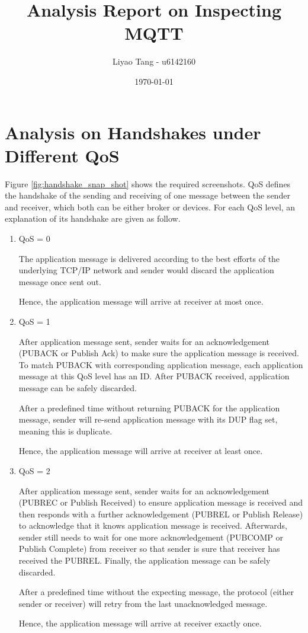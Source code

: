 \documentclass[12pt, letterpaper]{article}
\title{Analysis Report on Inspecting MQTT}
\author{Liyao Tang - u6142160}
\date{ \today}
\begin{document}
\begin{titlepage}
	\maketitle
\end{titlepage}

\section{Analysis on Handshakes under Different QoS}

Figure \ref{fig:handshake_snap_shot} shows the required screenshots. QoS defines the handshake of the sending and receiving of one message between the sender and receiver, which both can be either broker or devices. For each QoS level, an explanation of its handshake are given as follow.
\begin{enumerate}

	\item QoS = 0
	
	The application message is delivered according to the best efforts of the underlying TCP/IP network and sender would discard the application message once sent out. 
	
	Hence, the application message will arrive at receiver at most once.
	
	\item QoS = 1
	
	After application message sent, sender waits for an acknowledgement (PUBACK or Publish Ack) to make sure the application message is received. To match PUBACK with corresponding application message, each application message at this QoS level has an ID. After PUBACK received, application message can be safely discarded.
	
	After a predefined time without returning PUBACK for the application message, sender will re-send application message with its DUP flag set, meaning this is duplicate. 
	
	Hence, the application message will arrive at receiver at least once.
	
	\item QoS = 2
	
	After application message sent, sender waits for an acknowledgement (PUBREC or Publish Received) to ensure application message is received and then responds with a further acknowledgement (PUBREL or Publish Release) to acknowledge that it knows application message is received. Afterwards, sender still needs to wait for one more acknowledgement (PUBCOMP or Publish Complete) from receiver so that sender is sure that receiver has received the PUBREL. Finally, the application message can be safely discarded.
	
	After a predefined time without the expecting message, the protocol (either sender or receiver) will retry from the last unacknowledged message.
	
	Hence, the application message will arrive at receiver exactly once.
	
\end{enumerate}
\end{document}
